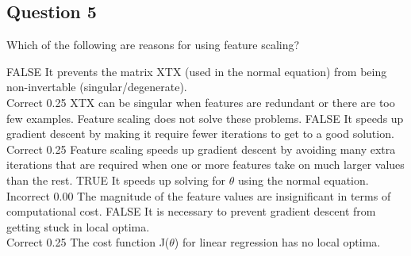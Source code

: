 \documentclass[]{article}
\begin{document}
\subsection*{Question 5}
Which of the following are reasons for using feature scaling?

FALSE It prevents the matrix XTX (used in the normal equation) from being non-invertable (singular/degenerate).	
\\Correct	0.25	 XTX can be singular when features are redundant or there are too few examples. Feature scaling does not solve these problems.
FALSE It speeds up gradient descent by making it require fewer iterations to get to a good solution.	
\\Correct	0.25	 Feature scaling speeds up gradient descent by avoiding many extra iterations that are required when one or more features take on much larger values than the rest.
TRUE It speeds up solving for $\theta$ using the normal equation.	
\\Incorrect	0.00	 The magnitude of the feature values are insignificant in terms of computational cost.
FALSE It is necessary to prevent gradient descent from getting stuck in local optima.	
\\Correct	0.25	 The cost function J($\theta$) for linear regression has no local optima.
\end{document}

